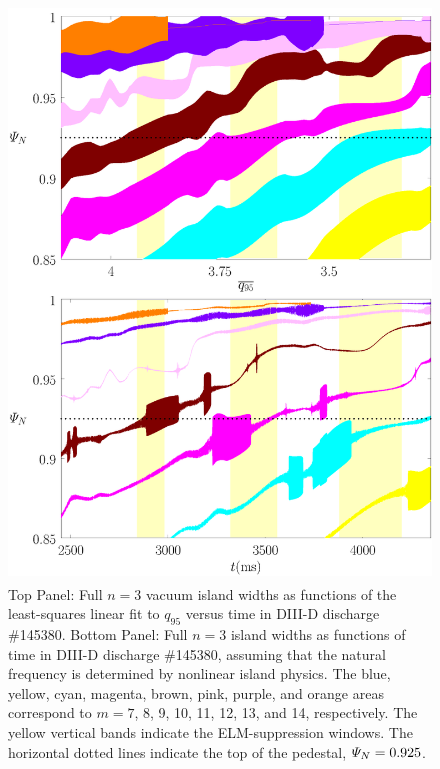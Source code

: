 \documentclass[12pt,prb,aps]{revtex4-1}
\begin{document}
\begin{figure}
\includegraphics[height=6in]{fig6.pdf}
\caption{Top Panel: Full  $n=3$ vacuum island widths as functions of the least-squares linear fit to $q_{95}$ versus time 
in   DIII-D discharge \#145380.
Bottom Panel:  Full $n=3$ island widths as functions of time
in   DIII-D discharge \#145380, assuming that the natural frequency is determined by nonlinear island physics. The blue, yellow, cyan, magenta, brown, pink,
purple, and orange  areas correspond to $m=7$, 8, 9, 10, 11, 12, 13, and 14, respectively. The yellow vertical bands indicate the ELM-suppression windows. 
The horizontal dotted lines indicate the top of the pedestal, ${\mit\Psi}_N=0.925$.} \label{fig6}
\end{figure}
\end{document}
